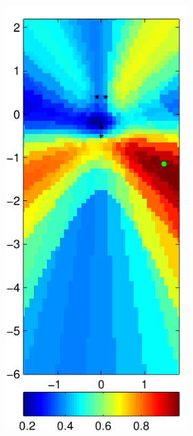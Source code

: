 \documentclass[spanish,openright]{book}
\begin{document}
\begin{figure}
\begin{subfigure}[t]{0.47\textwidth}
\begin{minipage}[t]{\textwidth}
\begin{subfigure}[t]{0.3\textwidth}
\label{fig:SRP_Fo1500_pos01}
\end{subfigure}
\begin{subfigure}[t]{0.3\textwidth}
\includegraphics[width=\textwidth]{SRP_Fo1500_mean_pos01}

\end{subfigure}
\end{minipage}
\end{subfigure}
\end{figure}
\end{document}
